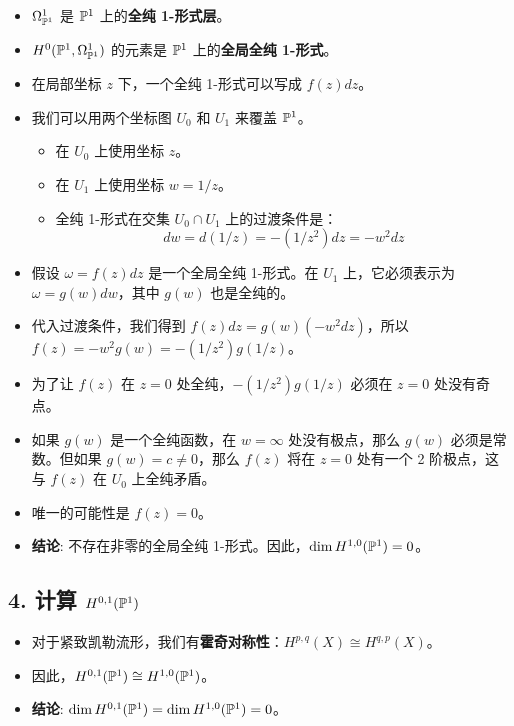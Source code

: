 \documentclass{amsart}
\let\originalmathbb\mathbb
\renewcommand{\mathbb}[1]{%
    \ifstrequal{#1}{1}{\mathbbm{#1}}{\originalmathbb{#1}}%
}
\theoremstyle{plain}
\theoremstyle{definition}
\theoremstyle{remark}
\begin{document}
\begin{itemize}
	\item $\Omega^1_{\mathbb{P}^1}$ 是 $\mathbb{P}^1$ 上的\textbf{全纯 1-形式层}。
	\item $H^0(\mathbb{P}^1, \Omega^1_{\mathbb{P}^1})$ 的元素是 $\mathbb{P}^1$ 上的\textbf{全局全纯 1-形式}。
	\item 在局部坐标 $z$ 下，一个全纯 1-形式可以写成 $f(z) dz$。
	\item 我们可以用两个坐标图 $U_0$ 和 $U_1$ 来覆盖 $\mathbb{P}^1$。
	\begin{itemize}
		\item 在 $U_0$ 上使用坐标 $z$。
		\item 在 $U_1$ 上使用坐标 $w = 1/z$。
		\item 全纯 1-形式在交集 $U_0 \cap U_1$ 上的过渡条件是：
\[
dw = d(1/z) = -(1/z^2)dz = -w^2 dz
\]
	\end{itemize}
	\item 假设 $\omega = f(z)dz$ 是一个全局全纯 1-形式。在 $U_1$ 上，它必须表示为 $\omega = g(w)dw$，其中 $g(w)$ 也是全纯的。
	\item 代入过渡条件，我们得到 $f(z)dz = g(w)(-w^2 dz)$，所以 $f(z) = -w^2 g(w) = -(1/z^2)g(1/z)$。
	\item 为了让 $f(z)$ 在 $z=0$ 处全纯，$-(1/z^2)g(1/z)$ 必须在 $z=0$ 处没有奇点。
	\item 如果 $g(w)$ 是一个全纯函数，在 $w=\infty$ 处没有极点，那么 $g(w)$ 必须是常数。但如果 $g(w)=c \ne 0$，那么 $f(z)$ 将在 $z=0$ 处有一个 2 阶极点，这与 $f(z)$ 在 $U_0$ 上全纯矛盾。
	\item 唯一的可能性是 $f(z) = 0$。
	\item \textbf{结论}: 不存在非零的全局全纯 1-形式。因此，$\dim H^{1,0}(\mathbb{P}^1) = 0$。
\end{itemize}

\subsection{4. 计算 \texorpdfstring{$H^{0,1}(\mathbb{P}^1)$}{H^0,1(P^1)}}

\begin{itemize}
	\item 对于紧致凯勒流形，我们有\textbf{霍奇对称性}：$H^{p,q}(X) \cong H^{q,p}(X)$。
	\item 因此，$H^{0,1}(\mathbb{P}^1) \cong H^{1,0}(\mathbb{P}^1)$。
	\item \textbf{结论}: $\dim H^{0,1}(\mathbb{P}^1) = \dim H^{1,0}(\mathbb{P}^1) = 0$。
\end{itemize}
\end{document}
